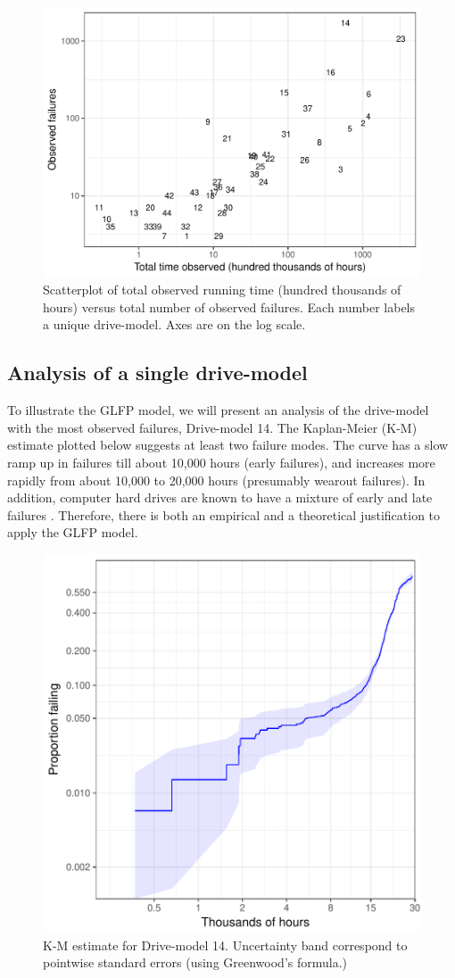 \documentclass[12pt]{article}
\begin{document}
\begin{figure}[H]
  \includegraphics[width=.9\textwidth]{dm-summ-scatter.pdf}
  \caption{Scatterplot of total observed running time (hundred thousands of hours) versus total number of observed failures.  Each number labels a unique drive-model.   Axes are on the log scale.}
  \label{drive-scatter}
\end{figure}

\subsection{Analysis of a single drive-model}
\label{subsec:ex1}
To illustrate the GLFP model, we will present an analysis of the drive-model with the most observed failures, Drive-model 14.  The Kaplan-Meier (K-M) estimate plotted below suggests at least two failure modes.  The curve has a slow ramp up in failures till about 10,000 hours (early failures), and increases more rapidly from about 10,000 to 20,000 hours (presumably wearout failures).  In addition, computer hard drives are known to have a mixture of early and late failures \citep{chan}.  Therefore, there is both an empirical and a theoretical justification to apply the GLFP model.

\begin{figure}[H]
\centering
  \includegraphics[width=.6\textwidth]{km14-prob}
  \caption{K-M estimate for Drive-model 14.  Uncertainty band correspond to pointwise standard errors (using Greenwood's formula.)}
  \label{fig1}
\end{figure}
\end{document}
